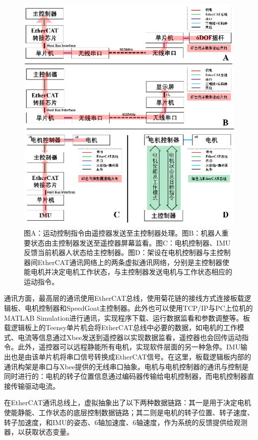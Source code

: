 \begin{figure}[h!]
  \centering
  \includegraphics[width=0.9\linewidth]{figures/Sec3/comm.png}
  \caption{
  图A：运动控制指令由遥控器发送至主控制器处理。图B：机器人重要状态由主控制器发送至遥控器屏幕监看。图C：电机控制器、IMU反馈当前机器人状态给主控制器。图D：架设在电机控制器与主控制器间EtherCAT通讯网络上的两条虚拟通讯网络，分别是主控制器使能电机并决定电机工作状态，与主控制器发送电机与工作状态相应的运动指令。
  }
  \label{fig:sec3-comm}
   \vspace{6pt}
\end{figure}

通讯方面，最高层的通讯使用EtherCAT总线，使用菊花链的接线方式连接板载逻辑板、电机控制器和SpeedGoat主控制器。此外也可以使用TCP/IP与PC上位机的MATLAB Simulation进行通讯，实现程序下载、运行数据监看和参数调整等。板载逻辑板上的Teensy单片机会将EtherCAT总线中必要的数据，如电机的工作模式、电流等信息通过Xbee发送到遥控器以实现数据监看，遥控器也会回传运动指令。此外，遥控器可以远程静能所有电机，实现软件层面的另一种急停。IMU输出也是由该单片机将串口信号转换成EtherCAT信号。在这里，板载逻辑板内部的通讯构架是串口与Xbee提供的无线串口抽象。电机与电机控制器的通讯与控制是同时进行的：电机的转子位置信息通过编码器传输给电机控制器，而电机控制器直接传输驱动电流。

在EtherCAT通讯总线上，虚拟抽象出了以下两种数据链路：其一是用于决定电机使能静能、工作状态的底层控制数据链路；其二则是电机的转子位置、转子速度、转子加速度，和IMU的姿态、6轴加速度、6轴速度，作为系统的反馈提供给观测器，以获取状态变量。

